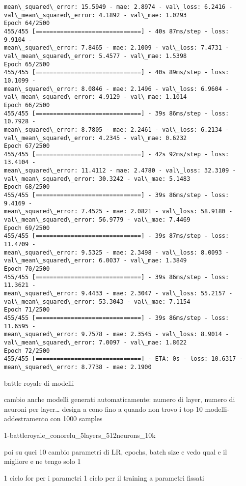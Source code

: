 \documentclass[11pt]{article}
\begin{document}
\begin{Verbatim}[commandchars=\\\{\}]
mean\_squared\_error: 15.5949 - mae: 2.8974 - val\_loss: 6.2416 -
val\_mean\_squared\_error: 4.1892 - val\_mae: 1.0293
Epoch 64/2500
455/455 [==============================] - 40s 87ms/step - loss: 9.9104 -
mean\_squared\_error: 7.8465 - mae: 2.1009 - val\_loss: 7.4731 -
val\_mean\_squared\_error: 5.4577 - val\_mae: 1.5398
Epoch 65/2500
455/455 [==============================] - 40s 89ms/step - loss: 10.1099 -
mean\_squared\_error: 8.0846 - mae: 2.1496 - val\_loss: 6.9604 -
val\_mean\_squared\_error: 4.9129 - val\_mae: 1.1014
Epoch 66/2500
455/455 [==============================] - 39s 86ms/step - loss: 10.7928 -
mean\_squared\_error: 8.7805 - mae: 2.2461 - val\_loss: 6.2134 -
val\_mean\_squared\_error: 4.2345 - val\_mae: 0.6232
Epoch 67/2500
455/455 [==============================] - 42s 92ms/step - loss: 13.4104 -
mean\_squared\_error: 11.4112 - mae: 2.4780 - val\_loss: 32.3109 -
val\_mean\_squared\_error: 30.3242 - val\_mae: 5.1483
Epoch 68/2500
455/455 [==============================] - 39s 86ms/step - loss: 9.4169 -
mean\_squared\_error: 7.4525 - mae: 2.0821 - val\_loss: 58.9180 -
val\_mean\_squared\_error: 56.9779 - val\_mae: 7.4469
Epoch 69/2500
455/455 [==============================] - 39s 87ms/step - loss: 11.4709 -
mean\_squared\_error: 9.5325 - mae: 2.3498 - val\_loss: 8.0093 -
val\_mean\_squared\_error: 6.0037 - val\_mae: 1.3849
Epoch 70/2500
455/455 [==============================] - 39s 86ms/step - loss: 11.3621 -
mean\_squared\_error: 9.4433 - mae: 2.3047 - val\_loss: 55.2157 -
val\_mean\_squared\_error: 53.3043 - val\_mae: 7.1154
Epoch 71/2500
455/455 [==============================] - 39s 86ms/step - loss: 11.6595 -
mean\_squared\_error: 9.7578 - mae: 2.3545 - val\_loss: 8.9014 -
val\_mean\_squared\_error: 7.0097 - val\_mae: 1.8622
Epoch 72/2500
455/455 [==============================] - ETA: 0s - loss: 10.6317 -
mean\_squared\_error: 8.7738 - mae: 2.1900
    \end{Verbatim}

    battle royale di modelli

cambio anche modelli generati automaticamente: numero di layer, numero
di neuroni per layer\ldots{} design a cono fino a quando non trovo i top
10 modelli- addestramento con 1000 samples

1-battleroyale\_conorelu\_5layers\_512neurons\_10k

poi su quei 10 cambio parametri di LR, epochs, batch size e vedo qual e
il migliore e ne tengo solo 1

1 ciclo for per i parametri 1 ciclo per il training a parametri fissati
\end{document}

